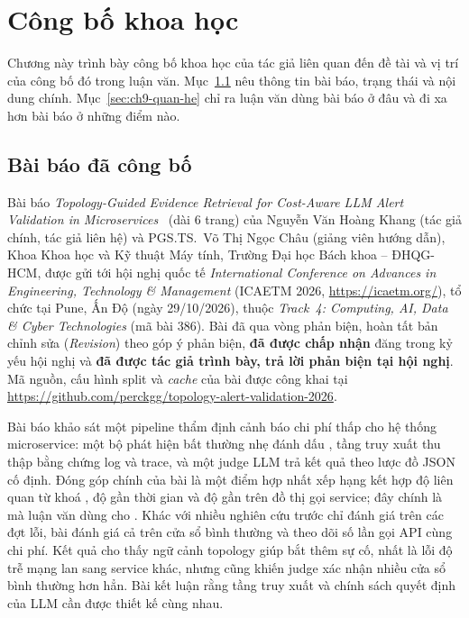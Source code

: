 
\section{Công bố khoa học}
\label{ch:cong-bo}

Chương này trình bày công bố khoa học của tác giả liên quan đến đề tài và vị trí của công bố đó trong luận văn. Mục~\ref{sec:ch9-bai-bao} nêu thông tin bài báo, trạng thái và nội dung chính. Mục~\ref{sec:ch9-quan-he} chỉ ra luận văn dùng bài báo ở đâu và đi xa hơn bài báo ở những điểm nào.

\subsection{Bài báo đã công bố}
\label{sec:ch9-bai-bao}

Bài báo \emph{Topology-Guided Evidence Retrieval for Cost-Aware LLM Alert Validation in Microservices}~\cite{icaetm2026} (dài 6 trang) của Nguyễn Văn Hoàng Khang (tác giả chính, tác giả liên hệ) và PGS.TS.~Võ Thị Ngọc Châu (giảng viên hướng dẫn), Khoa Khoa học và Kỹ thuật Máy tính, Trường Đại học Bách khoa -- ĐHQG-HCM, được gửi tới hội nghị quốc tế \emph{International Conference on Advances in Engineering, Technology \& Management} (ICAETM 2026, \url{https://icaetm.org/}), tổ chức tại Pune, Ấn Độ (ngày 29/10/2026), thuộc \emph{Track~4: Computing, AI, Data \& Cyber Technologies} (mã bài 386). Bài đã qua vòng phản biện, hoàn tất bản chỉnh sửa (\emph{Revision}) theo góp ý phản biện, \textbf{đã được chấp nhận} đăng trong kỷ yếu hội nghị và \textbf{đã được tác giả trình bày, trả lời phản biện tại hội nghị}. Mã nguồn, cấu hình split và \textit{cache} của bài được công khai tại \url{https://github.com/perckgg/topology-alert-validation-2026}.

Bài báo khảo sát một pipeline thẩm định cảnh báo chi phí thấp cho hệ thống microservice: một bộ phát hiện bất thường nhẹ đánh dấu , tầng truy xuất thu thập bằng chứng log và trace, và một judge LLM trả kết quả theo lược đồ JSON cố định. Đóng góp chính của bài là một điểm hợp nhất xếp hạng kết hợp độ liên quan từ khoá , độ gần thời gian và độ gần trên đồ thị gọi service; đây chính là  mà luận văn dùng cho . Khác với nhiều nghiên cứu trước chỉ đánh giá trên các đợt lỗi, bài đánh giá cả trên cửa sổ bình thường và theo dõi số lần gọi API cùng chi phí. Kết quả cho thấy ngữ cảnh topology giúp bắt thêm sự cố, nhất là lỗi độ trễ mạng lan sang service khác, nhưng cũng khiến judge xác nhận nhiều cửa sổ bình thường hơn hẳn. Bài kết luận rằng tầng truy xuất và chính sách quyết định của LLM cần được thiết kế cùng nhau.

